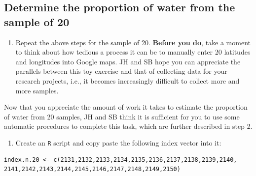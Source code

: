 \documentclass[letterpaper,9pt,twoside,printwatermark=false]{pinp}
\providecommand{\tightlist}{%
  \setlength{\itemsep}{0pt}\setlength{\parskip}{0pt}}
\begin{document}
\subsection{Determine the proportion of water from the sample of
20}\label{determine-the-proportion-of-water-from-the-sample-of-20}

\begin{enumerate}
\def\labelenumi{\arabic{enumi}.}
\tightlist
\item
  Repeat the above steps for the sample of 20. \textbf{Before you do},
  take a moment to think about how tedious a process it can be to
  manually enter 20 latitudes and longitudes into Google maps. JH and SB
  hope you can appreciate the parallels between this toy exercise and
  that of collecting data for your research projects, i.e., it becomes
  increasingly difficult to collect more and more samples.
\end{enumerate}

Now that you appreciate the amount of work it takes to estimate the
proportion of water from 20 samples, JH and SB think it is sufficient
for you to use some automatic procedures to complete this task, which
are further described in step 2.

\begin{enumerate}
\def\labelenumi{\arabic{enumi}.}
\setcounter{enumi}{1}
\tightlist
\item
  Create an \texttt{R} script and copy paste the following index vector
  into it:
\end{enumerate}

\begin{ShadedResult}
\begin{verbatim}
index.n.20 <- c(2131,2132,2133,2134,2135,2136,2137,2138,2139,2140,
2141,2142,2143,2144,2145,2146,2147,2148,2149,2150)
\end{verbatim}
\end{ShadedResult}





\end{document}
